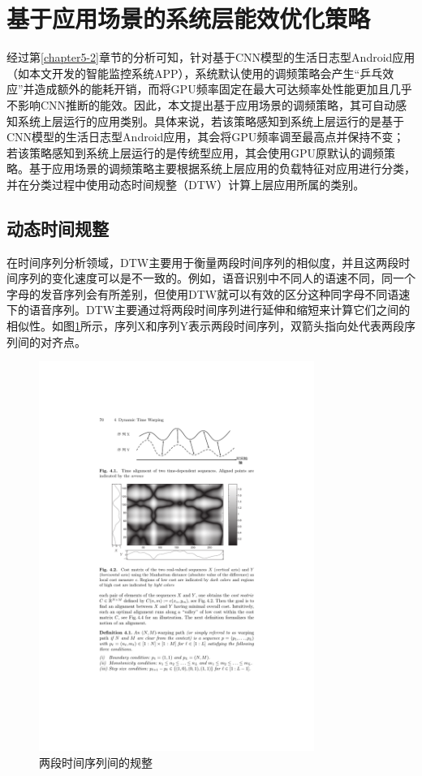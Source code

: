 \section{基于应用场景的系统层能效优化策略}
\label{chapter5-3}

经过第\ref{chapter5-2}章节的分析可知，针对基于CNN模型的生活日志型Android应用（如本文开发的智能监控系统APP），系统默认使用的调频策略会产生“乒乓效应”并造成额外的能耗开销，而将GPU频率固定在最大可达频率处性能更加且几乎不影响CNN推断的能效。因此，本文提出基于应用场景的调频策略，其可自动感知系统上层运行的应用类别。具体来说，若该策略感知到系统上层运行的是基于CNN模型的生活日志型Android应用，其会将GPU频率调至最高点并保持不变；若该策略感知到系统上层运行的是传统型应用，其会使用GPU原默认的调频策略。基于应用场景的调频策略主要根据系统上层应用的负载特征对应用进行分类，并在分类过程中使用动态时间规整（DTW\cite{muller2007dynamic}）计算上层应用所属的类别。

\subsection{动态时间规整}
\label{chapter5-3-1}
在时间序列分析领域，DTW主要用于衡量两段时间序列的相似度，并且这两段时间序列的变化速度可以是不一致的。例如，语音识别中不同人的语速不同，同一个字母的发音序列会有所差别，但使用DTW就可以有效的区分这种同字母不同语速下的语音序列。DTW主要通过将两段时间序列进行延伸和缩短来计算它们之间的相似性。如图\ref{figure:figure39}所示，序列X和序列Y表示两段时间序列，双箭头指向处代表两段序列间的对齐点。

\begin{figure}[htbp]
    \centering
    \includegraphics[width=0.8\textwidth]{figures/dtw.pdf}
    \caption{两段时间序列间的规整}\label{figure:figure39}
\end{figure}

